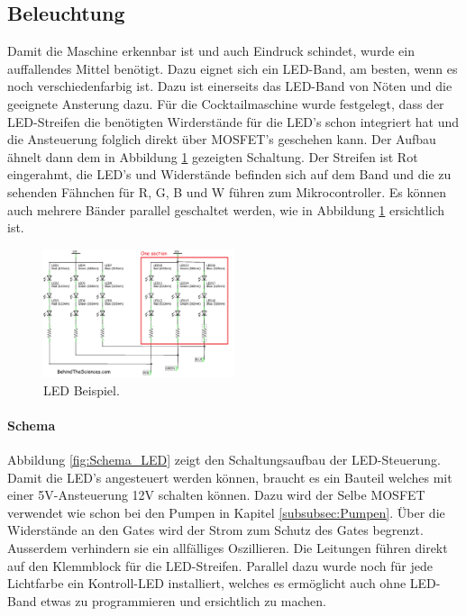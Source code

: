 \subsection{Beleuchtung}
\label{subsec:Beleuchtung_2}

Damit die Maschine erkennbar ist und auch Eindruck schindet, wurde ein auffallendes Mittel benötigt. Dazu eignet sich ein LED-Band, am besten, wenn es noch verschiedenfarbig ist. Dazu ist einerseits das LED-Band von Nöten und die geeignete Ansterung dazu. Für die Cocktailmaschine wurde festgelegt, dass der LED-Streifen die benötigten Wirderstände für die LED's schon integriert hat und die Ansteuerung folglich direkt über MOSFET's geschehen kann. Der Aufbau ähnelt dann dem in Abbildung \ref{fig:LED1} gezeigten Schaltung. Der Streifen ist Rot eingerahmt, die LED's und Widerstände befinden sich auf dem Band und die zu sehenden Fähnchen für R, G, B und W führen zum Mikrocontroller. Es können auch mehrere Bänder parallel geschaltet werden, wie in Abbildung \ref{fig:LED1} ersichtlich ist.

\begin{figure}[h!]
\center
\includegraphics[width = 0.5\textwidth]{graphics/Schema_LED1}
\caption{LED Beispiel. \cite{behindthesciences_rgb_2017}}
\label{fig:LED1}
\end{figure}

\paragraph{Schema}\mbox{}

Abbildung \ref{fig:Schema_LED} zeigt den Schaltungsaufbau der LED-Steuerung. Damit die LED's angesteuert werden können, braucht es ein Bauteil welches mit einer 5V-Ansteuerung 12V schalten können. Dazu wird der Selbe MOSFET verwendet wie schon bei den Pumpen in Kapitel \ref{subsubsec:Pumpen}. Über die Widerstände an den Gates wird der Strom zum Schutz des Gates begrenzt. Ausserdem verhindern sie ein allfälliges Oszillieren. Die Leitungen führen direkt auf den Klemmblock für die LED-Streifen. Parallel dazu wurde noch für jede Lichtfarbe ein Kontroll-LED installiert, welches es ermöglicht auch ohne LED-Band etwas zu programmieren und ersichtlich zu machen.

